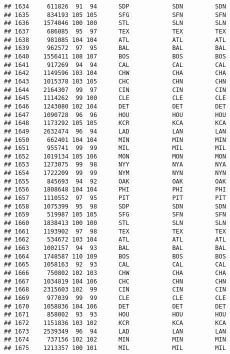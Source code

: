 \documentclass[]{article}
\begin{document}
\begin{verbatim}
## 1634     611826  91  94      SDP            SDN         SDN
## 1635     834193 105 105      SFG            SFN         SFN
## 1636    1574046 100 100      STL            SLN         SLN
## 1637     686085  95  97      TEX            TEX         TEX
## 1638     981085 104 104      ATL            ATL         ATL
## 1639     962572  97  95      BAL            BAL         BAL
## 1640    1556411 108 107      BOS            BOS         BOS
## 1641     917269  94  94      CAL            CAL         CAL
## 1642    1149596 103 104      CHW            CHA         CHA
## 1643    1015378 103 105      CHC            CHN         CHN
## 1644    2164307  99  97      CIN            CIN         CIN
## 1645    1114262  99 100      CLE            CLE         CLE
## 1646    1243080 102 104      DET            DET         DET
## 1647    1090728  96  96      HOU            HOU         HOU
## 1648    1173292 105 105      KCR            KCA         KCA
## 1649    2632474  96  94      LAD            LAN         LAN
## 1650     662401 104 104      MIN            MIN         MIN
## 1651     955741  99  99      MIL            MIL         MIL
## 1652    1019134 105 106      MON            MON         MON
## 1653    1273075  99  98      NYY            NYA         NYA
## 1654    1722209  99  99      NYM            NYN         NYN
## 1655     845693  94  92      OAK            OAK         OAK
## 1656    1808648 104 104      PHI            PHI         PHI
## 1657    1110552  97  95      PIT            PIT         PIT
## 1658    1075399  95  98      SDP            SDN         SDN
## 1659     519987 105 105      SFG            SFN         SFN
## 1660    1838413 100 100      STL            SLN         SLN
## 1661    1193902  97  98      TEX            TEX         TEX
## 1662     534672 103 104      ATL            ATL         ATL
## 1663    1002157  94  93      BAL            BAL         BAL
## 1664    1748587 110 109      BOS            BOS         BOS
## 1665    1058163  92  93      CAL            CAL         CAL
## 1666     750802 102 103      CHW            CHA         CHA
## 1667    1034819 104 106      CHC            CHN         CHN
## 1668    2315603 102  99      CIN            CIN         CIN
## 1669     977039  99  99      CLE            CLE         CLE
## 1670    1058836 104 106      DET            DET         DET
## 1671     858002  93  93      HOU            HOU         HOU
## 1672    1151836 103 102      KCR            KCA         KCA
## 1673    2539349  96  94      LAD            LAN         LAN
## 1674     737156 102 102      MIN            MIN         MIN
## 1675    1213357 100 101      MIL            MIL         MIL

\end{verbatim}
\end{document}
